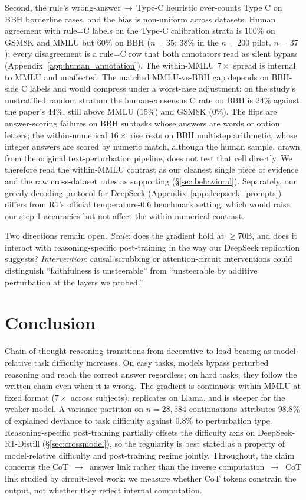 \documentclass[10pt]{article} %
\begin{document}
Second, the rule's wrong-answer$\,\to\,$Type-C heuristic over-counts Type C on BBH borderline cases, and the bias is non-uniform across datasets. Human agreement with rule=C labels on the Type-C calibration strata is $100\%$ on GSM8K and MMLU but $60\%$ on BBH ($n = 35$; $38\%$ in the $n = 200$ pilot, $n = 37$); every disagreement is a rule=C row that both annotators read as silent bypass (Appendix~\ref{app:human_annotation}). The within-MMLU $7\times$ spread is internal to MMLU and unaffected. The matched MMLU-vs-BBH gap depends on BBH-side C labels and would compress under a worst-case adjustment: on the study's unstratified random stratum the human-consensus C rate on BBH is $24\%$ against the paper's $44\%$, still above MMLU ($15\%$) and GSM8K ($0\%$). The flips are answer-scoring failures on BBH subtasks whose answers are words or option letters; the within-numerical $16\times$ rise rests on BBH multistep arithmetic, whose integer answers are scored by numeric match, although the human sample, drawn from the original text-perturbation pipeline, does not test that cell directly. We therefore read the within-MMLU contrast as our cleanest single piece of evidence and the raw cross-dataset rates as supporting (\S\ref{sec:behavioral}). Separately, our greedy-decoding protocol for DeepSeek (Appendix~\ref{app:deepseek_prompts}) differs from R1's official temperature-$0.6$ benchmark setting, which would raise our step-1 accuracies but not affect the within-numerical contrast.

Two directions remain open. \emph{Scale}: does the gradient hold at $\geq 70$B, and does it interact with reasoning-specific post-training in the way our DeepSeek replication suggests? \emph{Intervention}: causal scrubbing \citep{chan2022} or attention-circuit interventions \citep{ameisen2025} could distinguish ``faithfulness is unsteerable'' from ``unsteerable by additive perturbation at the layers we probed.''


\section{Conclusion}

Chain-of-thought reasoning transitions from decorative to load-bearing as model-relative task difficulty increases. On easy tasks, models bypass perturbed reasoning and reach the correct answer regardless; on hard tasks, they follow the written chain even when it is wrong. The gradient is continuous within MMLU at fixed format ($7\times$ across subjects), replicates on Llama, and is steeper for the weaker model. A variance partition on $n = 28{,}584$ continuations attributes $98.8\%$ of explained deviance to task difficulty against $0.8\%$ to perturbation type. Reasoning-specific post-training partially offsets the difficulty axis on DeepSeek-R1-Distill (\S\ref{sec:crossmodel}), so the regularity is best stated as a property of model-relative difficulty and post-training regime jointly. Throughout, the claim concerns the CoT~$\to$~answer link rather than the inverse computation~$\to$~CoT link studied by circuit-level work: we measure whether CoT tokens constrain the output, not whether they reflect internal computation.
\end{document}
